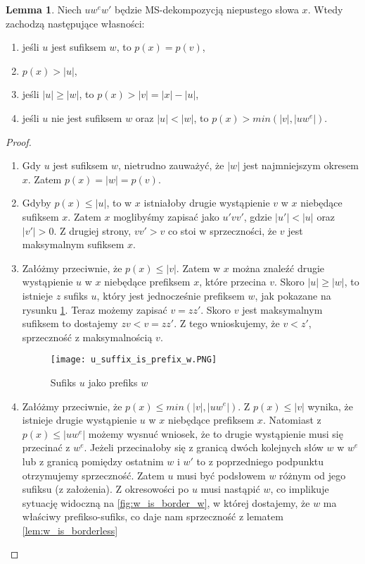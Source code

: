 \documentclass[a4paper,11pt]{article}
\theoremstyle{definition}
\newtheorem{lemma}{Lemma}[section]
\begin{document}
\begin{lemma}\label{lem:maximul_suffix_properties}
Niech $uw^ew'$ będzie MS-dekompozycją niepustego słowa $x$. Wtedy zachodzą następujące własności:
\begin{enumerate}
    \item jeśli $u$ jest sufiksem $w$, to $p(x) = p(v)$,
    \item $p(x) > |u|$,
    \item jeśli $|u| \geq |w|$, to $p(x) > |v| = |x| - |u|$,
    \item jeśli $u$ nie jest sufiksem $w$ oraz $|u| < |w|$, to $p(x) > min(|v|, |uw^e|)$.
\end{enumerate}
\begin{proof}


\begin{enumerate}
    \item Gdy $u$ jest sufiksem $w$, nietrudno zauważyć, że $|w|$ jest najmniejszym okresem $x$. Zatem $p(x) = |w| = p(v)$.
    \item Gdyby $p(x) \leq |u|$, to w $x$ istniałoby drugie wystąpienie $v$ w $x$ niebędące sufiksem $x$. Zatem $x$ moglibyśmy zapisać jako $u'vv'$, gdzie $|u'| < |u|$ oraz $|v'| > 0$. Z drugiej strony, $vv' > v$ co stoi w sprzeczności, że $v$ jest maksymalnym sufiksem $x$.   
    \item Załóżmy przeciwnie, że $p(x) \leq |v|$. Zatem w $x$ można znaleźć drugie wystąpienie $u$ w $x$ niebędące prefiksem $x$, które przecina $v$. Skoro $|u| \geq |w|$, to istnieje $z$ sufiks $u$, który jest jednocześnie prefiksem $w$, jak pokazane na rysunku \ref{fig:u_suffix_is_prefix_w}. Teraz możemy zapisać $v = zz'$. Skoro $v$ jest maksymalnym sufiksem to dostajemy $zv < v = zz'$. Z tego wnioskujemy, że $v < z'$, sprzeczność z maksymalnością $v$.
    \begin{figure}
    \centering
    \texttt{[image: u\_suffix\_is\_prefix\_w.PNG]} \\
    \caption{Sufiks $u$ jako prefiks $w$}
    \label{fig:u_suffix_is_prefix_w}
    \end{figure}
    \item Załóżmy przeciwnie, że $p(x) \leq min(|v|, |uw^e|)$. Z $p(x) \leq |v|$ wynika, że istnieje drugie wystąpienie $u$ w $x$ niebędące prefiksem $x$. Natomiast z $p(x) \leq |uw^e|$ możemy wysnuć wniosek, że to drugie wystąpienie musi się przecinać z $w^e$. Jeżeli przecinałoby się z granicą dwóch kolejnych słów $w$ w $w^e$ lub z granicą pomiędzy ostatnim $w$ i $w'$ to z poprzedniego podpunktu otrzymujemy sprzeczność. Zatem $u$ musi być podsłowem $w$ różnym od jego sufiksu (z założenia). Z okresowości po $u$ musi nastąpić $w$, co implikuje sytuację widoczną na \ref{fig:w_is_border_w}, w której dostajemy, że $w$ ma właściwy prefikso-sufiks, co daje nam sprzeczność z lematem \ref{lem:w_is_borderless}

\end{enumerate}
\end{proof}
\end{lemma}
\end{document}
